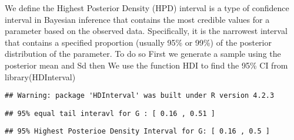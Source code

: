 \documentclass[
]{article}
\begin{document}
We define the Highest Posterior Density (HPD) interval is a type of
confidence interval in Bayesian inference that contains the most
credible values for a parameter based on the observed data.
Specifically, it is the narrowest interval that contains a specified
proportion (usually 95\% or 99\%) of the posterior distribution of the
parameter. To do so First we generate a sample using the posterior mean
and Sd then We use the function HDI to find the 95\% CI from
library(HDInterval)

\begin{verbatim}
## Warning: package 'HDInterval' was built under R version 4.2.3
\end{verbatim}

\begin{verbatim}
## 95% equal tail interavl for G : [ 0.16 , 0.51 ]
\end{verbatim}

\begin{verbatim}
## 95% Highest Posterioe Density Interval for G: [ 0.16 , 0.5 ]
\end{verbatim}
\end{document}
